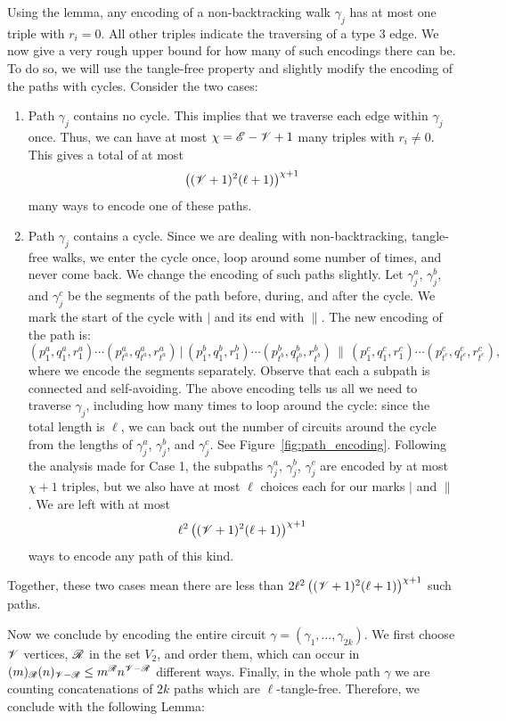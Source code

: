 Using the lemma, any encoding of a non-backtracking walk
$\gamma_j$ has
at most one triple with $r_i=0$. 
All other triples indicate the
traversing of a type 3 edge. 
We now give a very rough upper bound for 
how many of such encodings there can be. 
To do so, we will use the tangle-free property and
slightly modify the encoding of the paths with cycles.
Consider the two cases:
\begin{enumerate}[{Case} 1:]
\item {Path $\gamma_j$ contains no cycle.} 
This implies that we traverse each edge within
$\gamma_j$ once. 
Thus, we can have at most $\chi= \mathscr{E} - \mathscr{V} + 1$ many
triples with $r_i\neq 0$. 
This gives a total
of at most
\[ 
 \left((\mathscr{V}+1)^2 (\ell+1) \right)^{\chi+1}
\]
many ways to encode one of these paths.
\item 
{Path $\gamma_j$ contains a cycle.} 
Since we are dealing with non-backtracking, tangle-free walks, 
we enter the cycle once, 
loop around some number of times, 
and never come back. 
We change the encoding of such paths slightly. 
Let $\gamma_j^{a}$, $\gamma_j^{b}$, and $\gamma_j^{c}$
be the segments of the path before, during, and after the cycle.
We mark the start of the cycle with $|$ and its end with $\|$. 
The new encoding of the path is:
\[ 
(p^a_1,q^a_1,r^a_1) \cdots (p^a_{t^a},q^a_{t^a},r^a_{t^a}) 
\, | \,
(p^b_1,q^b_1,r^b_1) \cdots (p^b_{t^b},q^b_{t^b},r^b_{t^b}) 
\, \| \,
(p^c_1,q^c_1,r^c_1) \cdots (p^c_{t^c},q^c_{t^c},r^c_{t^c}),
\]
where we encode the segments separately. 
Observe that each a subpath is connected and self-avoiding.
The above encoding tells
us all we need to traverse $\gamma_j$,
including how many times to loop around the cycle:
since the total length is $\ell$, 
we can back out the number of circuits around the cycle
from the lengths of $\gamma_j^{a}$, $\gamma_j^{b}$, and $\gamma_j^{c}$.
See Figure~\ref{fig:path_encoding}.
Following the analysis made for Case 1, 
the subpaths $\gamma_j^{a}$, $\gamma_j^{b}$, $\gamma_j^{c}$
are encoded by at most $\chi + 1$ triples,
but we also have at most $\ell$ choices each for our marks
$|$ and $\|$. 
We are left with at most
\[
 \ell^2 \left((\mathscr{V}+1)^2 (\ell+1) \right)^{\chi+1}
\]
ways to encode any path of this kind.
\end{enumerate}
Together, these two cases mean there are less than
$
2 \ell^2 \left((\mathscr{V}+1)^2 (\ell+1) \right)^{\chi+1}
$
such paths.

Now we conclude by encoding the entire circuit 
$\gamma = (\gamma_1, \ldots, \gamma_{2k})$.
We first choose $\mathscr{V}$ vertices, $\mathscr{R}$ in the set $V_2$, and order them,
which can occur in 
$(m)_{\mathscr{R}} (n)_{\mathscr{V}-\mathscr{R}} \leq m^{\mathscr{R}} n^{\mathscr{V} - \mathscr{R}}$ different ways. 
Finally, in the whole path $\gamma$ 
we are counting concatenations of
$2k$ paths which are $\ell$-tangle-free.
Therefore, we conclude with the following Lemma:

